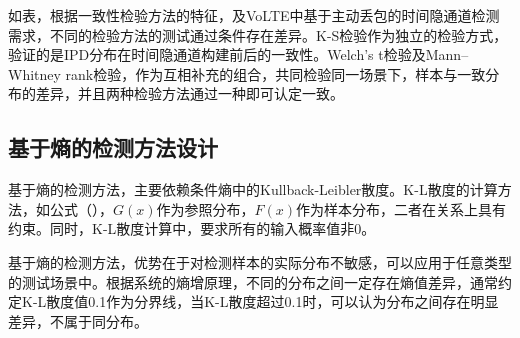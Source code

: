 
如表，根据一致性检验方法的特征，及VoLTE中基于主动丢包的时间隐通道检测需求，不同的检验方法的测试通过条件存在差异。K-S检验作为独立的检验方式，验证的是IPD分布在时间隐通道构建前后的一致性。Welch's t检验及Mann–Whitney rank检验，作为互相补充的组合，共同检验同一场景下，样本与一致分布的差异，并且两种检验方法通过一种即可认定一致。

\subsection{基于熵的检测方法设计}
\label{chap:analyze:statistical:entropy}

基于熵的检测方法，主要依赖条件熵中的Kullback-Leibler散度。K-L散度的计算方法，如公式（），$G(x)$作为参照分布，$F(x)$作为样本分布，二者在关系上具有约束。同时，K-L散度计算中，要求所有的输入概率值非0。

基于熵的检测方法，优势在于对检测样本的实际分布不敏感，可以应用于任意类型的测试场景中。根据系统的熵增原理，不同的分布之间一定存在熵值差异，通常约定K-L散度值0.1作为分界线，当K-L散度超过0.1时，可以认为分布之间存在明显差异，不属于同分布。

